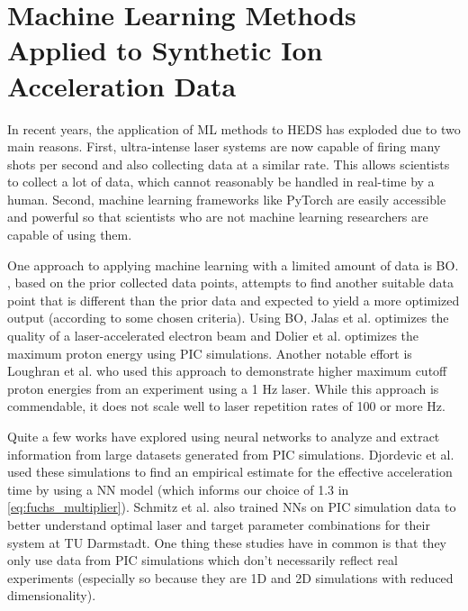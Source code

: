 \chapter{Machine Learning Methods Applied to Synthetic Ion Acceleration Data} \label{ch:5}

In recent years, the application of \gls{ML} methods to \gls{HEDS} has exploded due to two main reasons. First, ultra-intense laser systems are now capable of firing many shots per second and also collecting data at a similar rate. This allows scientists to collect a lot of data, which cannot reasonably be handled in real-time by a human. Second, machine learning frameworks like PyTorch \cite{PyTorch_2019} are easily accessible and powerful so that scientists who are not machine learning researchers are capable of using them.

One approach to applying machine learning with a limited amount of data is \gls{BO}. , based on the prior collected data points, attempts to find another suitable data point that is different than the prior data and expected to yield a more optimized output (according to some chosen criteria). Using \gls{BO}, Jalas et al. \cite{Jalas_2021_PRL} optimizes the quality of a laser-accelerated electron beam and Dolier et al. \cite{Dolier_2022_NJoP} optimizes the maximum proton energy using PIC simulations. Another notable effort is Loughran et al. \cite{Loughran_2023_HPLSE} who used this approach to demonstrate higher maximum cutoff proton energies from an experiment using a 1 Hz laser. While this approach is commendable, it does not scale well to laser repetition rates of 100 or more Hz. 

Quite a few works have explored using neural networks to analyze and extract information from large datasets generated from \gls{PIC} simulations. Djordevic et al. \cite{Djordjevic_2021_PPCF} used these simulations to find an empirical estimate for the effective acceleration time by using a \gls{NN} model (which informs our choice of 1.3 in \autoref{eq:fuchs_multiplier}). Schmitz et al. \cite{Schmitz_2023_LaPB} also trained \gls{NN}s on \gls{PIC} simulation data to better understand optimal laser and target parameter combinations for their system at TU Darmstadt. One thing these studies have in common is that they only use data from \gls{PIC} simulations which don't necessarily reflect real experiments (especially so because they are 1D and 2D simulations with reduced dimensionality). 

